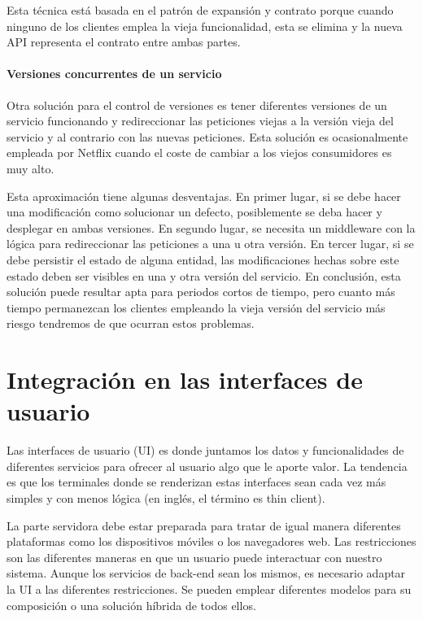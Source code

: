 \documentclass[11pt,a4paper]{article}
\begin{document}
Esta técnica está basada en el patrón de expansión y contrato porque cuando ninguno de los clientes emplea la vieja funcionalidad, esta se elimina y la nueva API representa el contrato entre ambas partes.

\subsection{Versiones concurrentes de un servicio}

Otra solución para el control de versiones es tener diferentes versiones de un servicio funcionando y redireccionar las peticiones viejas a la versión vieja del servicio y al contrario con las nuevas peticiones. Esta solución es ocasionalmente empleada por Netflix cuando el coste de cambiar a los viejos consumidores es muy alto.

Esta aproximación tiene algunas desventajas. En primer lugar, si se debe hacer una modificación como solucionar un defecto, posiblemente se deba hacer y desplegar en ambas versiones. En segundo lugar, se necesita un middleware con la lógica para redireccionar las peticiones a una u otra versión. En tercer lugar, si se debe persistir el estado de alguna entidad, las modificaciones hechas sobre este estado deben ser visibles en una y otra versión del servicio. En conclusión, esta solución puede resultar apta para periodos cortos de tiempo, pero cuanto más tiempo permanezcan los clientes empleando la vieja versión del servicio más riesgo tendremos de que ocurran estos problemas.

\part{Integración en las interfaces de usuario}

Las interfaces de usuario (UI) es donde juntamos los datos y funcionalidades de diferentes servicios para ofrecer al usuario algo que le aporte valor. La tendencia es que los terminales donde se renderizan estas interfaces sean cada vez más simples y con menos lógica (en inglés, el término es thin client). 

La parte servidora debe estar preparada para tratar de igual manera diferentes plataformas como los dispositivos móviles o los navegadores web. Las restricciones son las diferentes maneras en que un usuario puede interactuar con nuestro sistema. Aunque los servicios de back-end sean los mismos, es necesario adaptar la UI a las diferentes restricciones. Se pueden emplear diferentes modelos para su composición o una solución híbrida de todos ellos.
\end{document}
